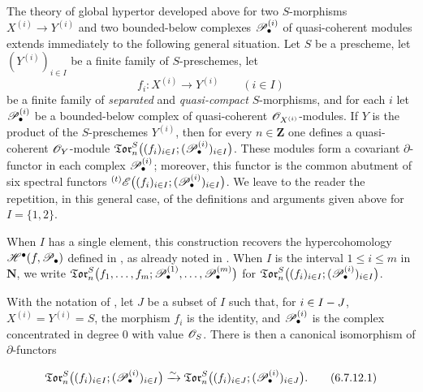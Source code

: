 \begin{env}[6.7.11]
\label{III.6.7.11}
The theory of global hypertor developed above for two
$S$-morphisms $X^{(i)}\to Y^{(i)}$ and two bounded-below
complexes $\mathscr{P}_\bullet^{(i)}$ of quasi-coherent modules extends
immediately to the following general situation.  Let $S$ be a
prescheme, let $(Y^{(i)})_{i\in I}$ be a finite family of
$S$-preschemes, let
\[
  f_i:X^{(i)}\longrightarrow Y^{(i)}
  \qquad (i\in I)
\]
be a finite family of \emph{separated} and \emph{quasi-compact}
$S$-morphisms, and for each $i$ let $\mathscr{P}_\bullet^{(i)}$ be a
bounded-below complex of quasi-coherent
$\mathscr{O}_{X^{(i)}}$-modules.  If $Y$ is the product of the
$S$-preschemes $Y^{(i)}$, then for every $n\in\mathbf Z$ one
defines a quasi-coherent $\mathscr{O}_Y$-module $\mathfrak{Tor}_n^S
\bigl(
(f_i)_{i\in I};
(\mathscr{P}_\bullet^{(i)})_{i\in I}
\bigr)$.
These modules form a covariant $\partial$-functor in each complex
$\mathscr{P}_\bullet^{(i)}$; moreover, this functor is the common
abutment of six spectral functors ${}^{(t)}\mathscr{E}
\bigl(
(f_i)_{i\in I};
(\mathscr{P}_\bullet^{(i)})_{i\in I}
\bigr)$.
We leave to the reader the repetition, in this general case, of
the definitions and arguments given above for $I=\{1,2\}$.

When $I$ has a single element, this construction recovers the
hypercohomology $\mathscr{H}^\bullet(f,\mathscr{P}_\bullet)$ defined in
, as already noted in .  When
$I$ is the interval $1\leq i\leq m$ in $\mathbf N$, we write
 $\mathfrak{Tor}_n^S
\bigl(
f_1,\ldots,f_m;
\mathscr{P}_\bullet^{(1)},\ldots,\mathscr{P}_\bullet^{(m)}
\bigr)$
for $\mathfrak{Tor}_n^S
\bigl(
(f_i)_{i\in I};
(\mathscr{P}_\bullet^{(i)})_{i\in I}
\bigr)$.
\end{env}

\begin{proposition}[6.7.12]
\label{III.6.7.12}
With the notation of , let $J$ be a subset of
$I$ such that, for $i\in I- J$, $X^{(i)}=Y^{(i)}=S$,
the morphism $f_i$ is the identity, and
$\mathscr{P}_\bullet^{(i)}$ is the complex concentrated in degree $0$
with value $\mathscr{O}_S$.  There is then a canonical isomorphism of
$\partial$-functors
\begin{env}[6.7.12.1]
\label{III.6.7.12.1}
\[
  \mathfrak{Tor}_n^S
  \bigl(
    (f_i)_{i\in I};
    (\mathscr{P}_\bullet^{(i)})_{i\in I}
  \bigr)
  \xrightarrow{\sim}
  \mathfrak{Tor}_n^S
  \bigl(
    (f_i)_{i\in J};
    (\mathscr{P}_\bullet^{(i)})_{i\in J}
  \bigr).
  \tag{6.7.12.1}\label{III.6.7.12.1.eq}
\]
\end{env}
\end{proposition}

